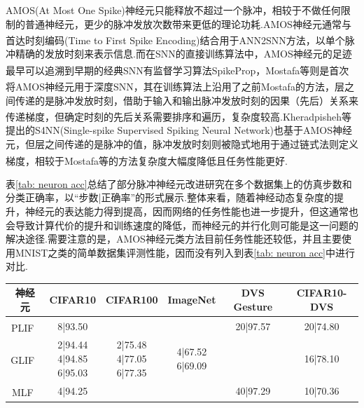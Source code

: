 \documentclass[10.5pt,compsoc,UTF8]{CjC}
\theoremstyle{mystyle}
\newcommand{\upcite}[1]{\textsuperscript{\cite{#1}}}
\begin{document}
\begin{multicols}{1}
AMOS(At Most One Spike)神经元只能释放不超过一个脉冲，相较于不做任何限制的普通神经元，更少的脉冲发放次数带来更低的理论功耗.AMOS神经元通常与首达时刻编码(Time to First Spike Encoding)结合用于ANN2SNN方法\upcite{8351295}，以单个脉冲精确的发放时刻来表示信息.而在SNN的直接训练算法中，AMOS神经元的足迹最早可以追溯到早期的经典SNN有监督学习算法SpikeProp\upcite{BOHTE200217}，Mostafa等\upcite{8050527}则是首次将AMOS神经元用于深度SNN，其在训练算法上沿用了之前Mostafa\upcite{mostafa2017supervised}的方法，层之间传递的是脉冲发放时刻，借助于输入和输出脉冲发放时刻的因果（先后）关系来传递梯度，但确定时刻的先后关系需要排序和遍历，复杂度较高.Kheradpisheh等\upcite{kheradpisheh2020temporal}提出的S4NN(Single-spike Supervised Spiking Neural Network)也基于AMOS神经元，但层之间传递的是脉冲的值，脉冲发放时刻则被隐式地用于通过链式法则定义梯度，相较于Mostafa等\upcite{8050527}的方法复杂度大幅度降低且任务性能更好.

表\ref{tab: neuron acc}总结了部分脉冲神经元改进研究在多个数据集上的仿真步数和分类正确率，以“步数|正确率”的形式展示.整体来看，随着神经动态复杂度的提升，神经元的表达能力得到提高，因而网络的任务性能也进一步提升，但这通常也会导致计算代价的提升和训练速度的降低，而神经元的并行化则可能是这一问题的解决途径.需要注意的是，AMOS神经元类方法目前任务性能还较低，并且主要使用MNIST之类的简单数据集评测性能，因而没有列入到表\ref{tab: neuron acc}中进行对比.


\begin{table}[H]
	\vspace {-2.5mm}
	\begin{center}
\begin{tabular}{cccccc}
	\toprule
	神经元 & CIFAR10 & CIFAR100 & ImageNet & DVS Gesture & CIFAR10-DVS \\ \hline
	PLIF~\upcite{fang2021incorporating} & 8|93.50 & & & 20|97.57 &20|74.80\\
	\hline
	
	GLIF~\upcite{yao2022glif} & \makecell[c]{2|94.44\\4|94.85\\6|95.03} &\makecell[c]{2|75.48\\4|77.05\\6|77.35} &\makecell[c]{4|67.52\\6|69.09}  & &16|78.10 \\
	\hline
	
	MLF~\upcite{ijcai2022p343} & 4|94.25 & & &40|97.29 & 10|70.36\\
	\hline
	

\end{tabular}
\end{center}
\end{table}
\end{multicols}
\end{document}

